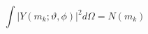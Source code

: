 \begin{equation}
\int \left| Y(m_{k};\vartheta ,\phi )\right| ^{2}d\Omega =N(m_{k})
\label{harmint}
\end{equation}

